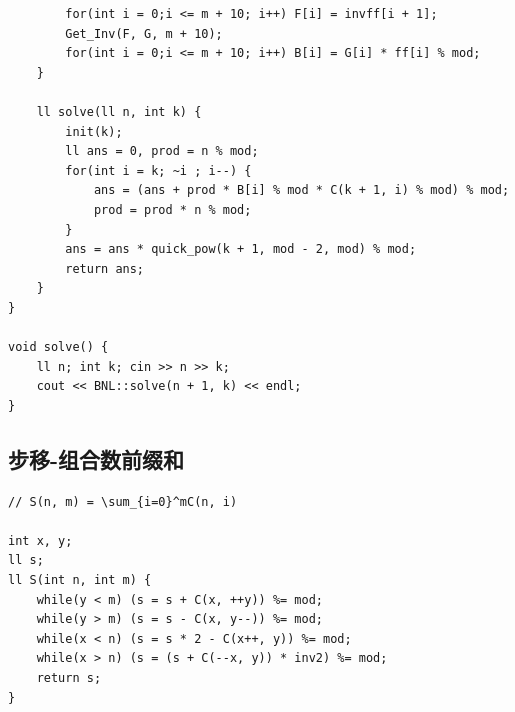 \documentclass[twoside]{article}
\begin{document}
\begin{lstlisting}
        for(int i = 0;i <= m + 10; i++) F[i] = invff[i + 1];
        Get_Inv(F, G, m + 10);
        for(int i = 0;i <= m + 10; i++) B[i] = G[i] * ff[i] % mod;
    }

    ll solve(ll n, int k) {
        init(k);
        ll ans = 0, prod = n % mod;
        for(int i = k; ~i ; i--) {
            ans = (ans + prod * B[i] % mod * C(k + 1, i) % mod) % mod;
            prod = prod * n % mod;
        }
        ans = ans * quick_pow(k + 1, mod - 2, mod) % mod;
        return ans;
    }
}

void solve() {
    ll n; int k; cin >> n >> k;
    cout << BNL::solve(n + 1, k) << endl;
}\end{lstlisting}
\subsection{步移-组合数前缀和}
\begin{lstlisting}
// S(n, m) = \sum_{i=0}^mC(n, i)

int x, y;
ll s;
ll S(int n, int m) {
    while(y < m) (s = s + C(x, ++y)) %= mod;
    while(y > m) (s = s - C(x, y--)) %= mod;
    while(x < n) (s = s * 2 - C(x++, y)) %= mod;
    while(x > n) (s = (s + C(--x, y)) * inv2) %= mod;
    return s;
}

\end{lstlisting}
\end{document}
